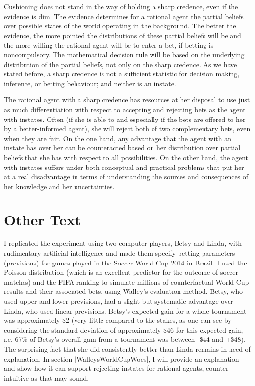 \documentclass[11pt]{article}
\begin{document}
Cushioning does not stand in the way of holding a sharp credence, even
if the evidence is dim. The evidence determines for a rational agent
the partial beliefs over possible states of the world operating in the
background. The better the evidence, the more pointed the
distributions of these partial beliefs will be and the more willing
the rational agent will be to enter a bet, if betting is
noncompulsory. The mathematical decision rule will be based on the
underlying distribution of the partial beliefs, not only on the sharp
credence. As we have stated before, a sharp credence is not a
sufficient statistic for decision making, inference, or betting
behaviour; and neither is an instate.

The rational agent with a sharp credence has resources at her disposal
to use just as much differentiation with respect to accepting and
rejecting bets as the agent with instates. Often (if she is able to
and especially if the bets are offered to her by a better-informed
agent), she will reject both of two complementary bets, even when they
are fair. On the one hand, any advantage that the agent with an
instate has over her can be counteracted based on her distribution
over partial beliefs that she has with respect to all possibilities.
On the other hand, the agent with instates suffers under both
conceptual and practical problems that put her at a real disadvantage
in terms of understanding the sources and consequences of her
knowledge and her uncertainties.

\section{Other Text}
\label{OtherText}

I replicated the experiment using two computer players, Betsy and
Linda, with rudimentary artificial intelligence and made them specify
betting parameters (previsions) for games played in the Soccer World
Cup 2014 in Brazil. I used the Poisson distribution (which is an
excellent predictor for the outcome of soccer matches) and the FIFA
ranking to simulate millions of counterfactual World Cup results and
their associated bets, using Walley's evaluation method. Betsy, who
used upper and lower previsions, had a slight but systematic advantage
over Linda, who used linear previsions. Betsy's expected gain for a
whole tournament was approximately \$2 (very little compared to the
stakes, as one can see by considering the standard deviation of
approximately \$46 for this expected gain, i.e. 67\% of Betsy's
overall gain from a tournament was between -\$44 and +\$48). The
surprising fact that she did consistently better than Linda remains in
need of explanation. In section \ref{WalleysWorldCupWoes}, I will
provide an explanation and show how it can support rejecting instates
for rational agents, counter-intuitive as that may sound.
\end{document}
